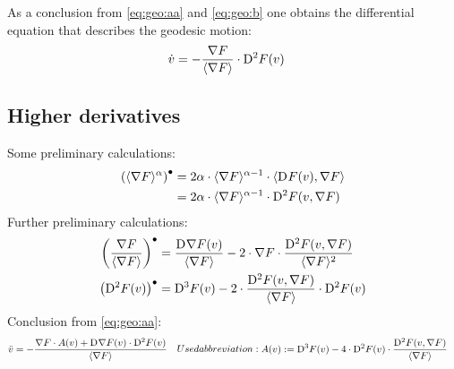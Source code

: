 As a conclusion from \eqref{eq:geo:aa} and \eqref{eq:geo:b}
one obtains the differential equation that describes the geodesic motion:
\begin{align}
\dot{ v }   &=  -\frac{ \nabla F  }{ \langle  \nabla F   \rangle } \cdot \mathrm{D}^{  2  } F ( v )
\end{align}



\subsection{Higher derivatives}


Some preliminary calculations:
\begin{subequations}    
    \begin{align}
        \left( \langle  \nabla F  \rangle^\alpha \right)^\bullet
        &=
        2 \alpha \cdot \langle  \nabla F  \rangle^{\alpha-1} \cdot
        \langle  \mathrm{D}^{  }F( v ) ,  \nabla F  \rangle   \\
        &=
        2 \alpha \cdot \langle  \nabla F  \rangle^{\alpha-1} \cdot
        \mathrm{D}^{ 2 }F( v, \nabla F )
    \end{align}
\end{subequations}
Further preliminary calculations:
\begin{align}
\left( \frac{ \nabla F  }{ \langle  \nabla F   \rangle } \right)^\bullet
&=   \frac{ \mathrm{D}^{  } \nabla F  ( v ) }{ \langle  \nabla F   \rangle }
            -  2 \cdot \nabla F  \cdot \frac{ \mathrm{D}^{  2  } F ( v, \nabla F  ) }{ \langle  \nabla F   \rangle^2 }\\
\left( \mathrm{D}^{  2  } F ( v ) \right)^\bullet  &=
\mathrm{D}^{  3  } F ( v )  -  2 \cdot \frac{ \mathrm{D}^{  2  } F ( v, \nabla F  ) }{ \langle  \nabla F   \rangle } \cdot \mathrm{D}^{ 2 }F( v )
\end{align}
Conclusion from \eqref{eq:geo:aa}:
\begin{subequations}
\begin{align}
\ddot{ v }   &=
- \frac{ \grad F \mult A( v )  +
\diff{}{ \grad{ F } }( v ) \mult \diff{ 2 }{ F }( v ) }{ \skaq{ \grad{ F } } }
\end{align}
Used abbreviation:
\begin{align}
    A( v )  &:=
    \diff{ 3 }{ F }( v ) -
    4 \mult \diff{ 2 }{ F }( v ) \mult
    \frac{ \diff{ 2 }{ F }( v, \grad{ F } ) }{ \skaq{ \grad{ F } } }
\end{align}
\end{subequations}